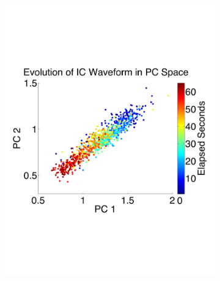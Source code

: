 \begin{center}
\begin{figure}
\begin{subfigure}[b]{.33\textwidth}
\includegraphics[width=\textwidth]{../figs/new/clusterevo.pdf}
\caption{}
\label{fig:clusterevo}
\end{subfigure}
\begin{subfigure}[b]{.33\textwidth}

\end{subfigure}
\end{figure}
\end{center}

